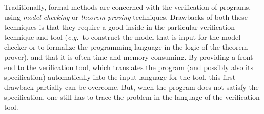 \documentclass[a4paper]{llncs}
\begin{document}

Traditionally, formal methods are concerned with the verification of
programs, using \textit{model checking} or 
\textit{theorem proving} techniques. Drawbacks of both these
techniques is that they require a good inside in the particular
verification technique and tool (\emph{e.g.}~to construct the model
that is input for the model checker or to formalize the programming
language in the logic of the theorem prover), and that it is often time
and memory consuming. By providing a front-end to the verification
tool, which translates the program (and possibly also its
specification) automatically into the input language for the tool,
this first drawback partially can be overcome. But, when the program
does not satisfy the specification, one still has to trace the problem 
in the language of the verification tool.


\end{document}
